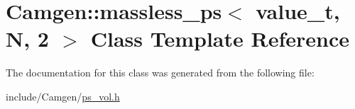 \hypertarget{a00354}{\section{Camgen\-:\-:massless\-\_\-ps$<$ value\-\_\-t, N, 2 $>$ Class Template Reference}
\label{a00354}
}


The documentation for this class was generated from the following file\-:\begin{DoxyCompactItemize}
\item 
include/\-Camgen/\hyperlink{a00719}{ps\-\_\-vol.\-h}\end{DoxyCompactItemize}
